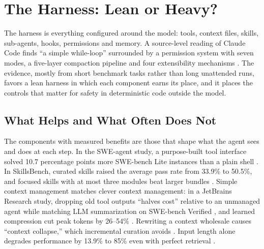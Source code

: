 \section{The Harness: Lean or Heavy?}\label{sec:harness}

The harness is everything configured around the model: tools, context files, skills, sub-agents, hooks, permissions and memory. A source-level reading of Claude Code finds ``a simple while-loop'' surrounded by a permission system with seven modes, a five-layer compaction pipeline and four extensibility mechanisms \citep{H16}. The evidence, mostly from short benchmark tasks rather than long unattended runs, favors a lean harness in which each component earns its place, and it places the controls that matter for safety in deterministic code outside the model.

\subsection{What Helps and What Often Does Not}

The components with measured benefits are those that shape what the agent sees and does at each step. In the SWE-agent study, a purpose-built tool interface solved 10.7 percentage points more SWE-bench Lite instances than a plain shell \citep{H10}. In SkillsBench, curated skills raised the average pass rate from 33.9\% to 50.5\%, and focused skills with at most three modules beat larger bundles \citep{H6}. Simple context management matches clever context management: in a JetBrains Research study, dropping old tool outputs ``halves cost'' relative to an unmanaged agent while matching LLM summarization on SWE-bench Verified \citep{H3}, and learned compression cut peak tokens by 26--54\% \citep{H4}. Rewriting a context wholesale causes ``context collapse,'' which incremental curation avoids \citep{H5}. Input length alone degrades performance by 13.9\% to 85\% even with perfect retrieval \citep{F22}.

